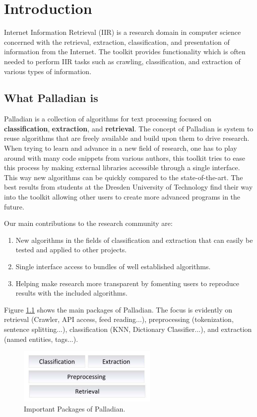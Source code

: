 \documentclass[a4paper,twoside]{book}      %
\begin{document}
\tableofcontents

\chapter{Introduction}
Internet Information Retrieval (IIR) is a research domain in computer science concerned with the retrieval, extraction, classification, and presentation of information from the Internet. The toolkit provides functionality which is often needed to perform IIR tasks such as crawling, classification, and extraction of various types of information.

\section{What Palladian is}
Palladian is a collection of algorithms for text processing focused on \textbf{ classification}, \textbf{ extraction}, and \textbf{ retrieval}. The concept of Palladian is system to reuse algorithms that are freely available and build upon them to drive research. When trying to learn and advance in a new field of research, one has to play around with many code snippets from various authors, this toolkit tries to ease this process by making external libraries accessible through a single interface. This way new algorithms can be quickly compared to the state-of-the-art.
The best results from students at the Dresden University of Technology find their way into the toolkit allowing other users to create more advanced programs in the future.

Our main contributions to the research community are:
\begin{enumerate}
\item New algorithms in the fields of classification and extraction that can easily be tested and applied to other projects.
\item Single interface access to bundles of well established algorithms.
\item Helping make research more transparent by fomenting users to reproduce results with the included algorithms.
\end{enumerate}

Figure \ref{fig:architecture} shows the main packages of Palladian. The focus is evidently on retrieval (Crawler, API access, feed reading...), preprocessing (tokenization, sentence splitting...), classification (KNN, Dictionary Classifier...), and extraction (named entities, tags...).

\begin{figure}[ht!]
\centering
\includegraphics[width=0.6\textwidth]{img/architecture.pdf}
\caption{Important Packages of Palladian.}
\label{fig:architecture}
\end{figure}
\end{document}
